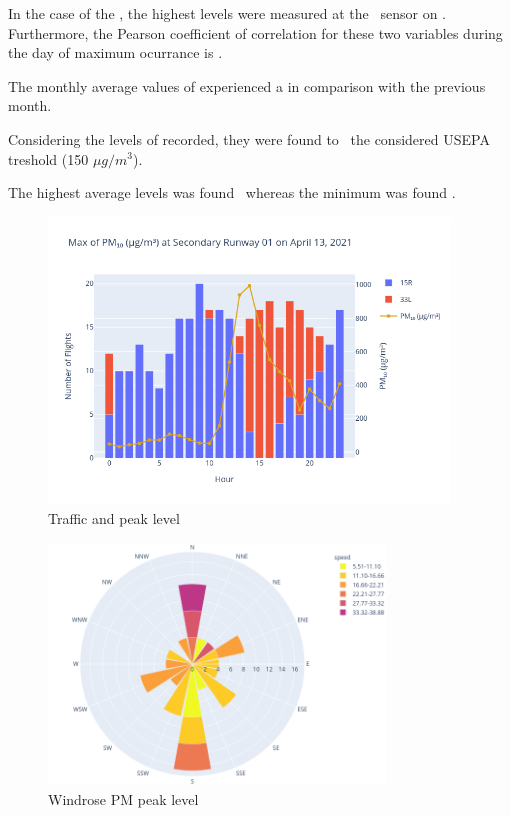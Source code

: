 \documentclass[12pt, oneside]{book}
\begin{document}
In the case of the , the highest levels were measured at the \stationMaxPMten\ sensor on \dayMaxPMten . 
Furthermore, the Pearson coefficient of correlation for these two variables during the day of maximum ocurrance is \correlPMten .

The monthly average values of  experienced a \monthChangePMten in comparison with the previous month.


Considering the levels of  recorded, they were found to \tresholdPMten\ the considered USEPA treshold (150 $\mu g/m^3$).

The highest average  levels was found \maxDailyPMten\ whereas the minimum was found \minDailyPMten .


{\begin{figure}[H]
\centering
\includegraphics[width=0.95\textwidth, keepaspectratio]{image15}
\caption{Traffic and  peak level}\label{image15}
\end{figure}}{}


{\begin{figure}[H]
\centering
\includegraphics[width=0.8\textwidth, keepaspectratio]{windrosePM₁₀}
\caption{Windrose PM peak level}\label{windrosePM10}
\end{figure}}{}
\end{document}
